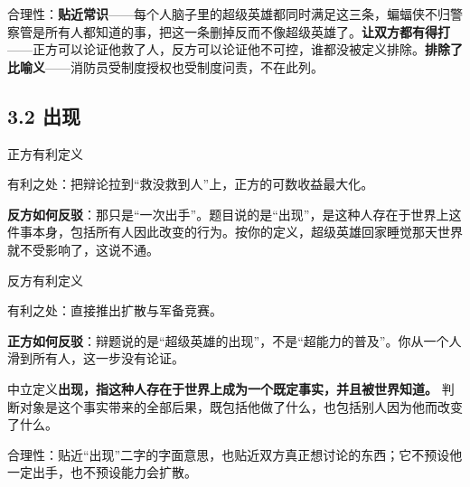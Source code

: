 \documentclass[prep,both]{debate}
\begin{document}
\begin{fields}
\begin{bullets}
\item 合理性：\textbf{贴近常识}——每个人脑子里的超级英雄都同时满足这三条，蝙蝠侠不归警察管是所有人都知道的事，把这一条删掉反而不像超级英雄了。\textbf{让双方都有得打}——正方可以论证他救了人，反方可以论证他不可控，谁都没被定义排除。\textbf{排除了比喻义}——消防员受制度授权也受制度问责，不在此列。
\end{bullets}
\end{fields}
\subsection{3.2 出现}
\begin{fields}
\begin{procard}{正方有利定义}\end{procard}
\begin{bullets}
\item 有利之处：把辩论拉到“救没救到人”上，正方的可数收益最大化。
\item \textbf{反方如何反驳}：那只是“一次出手”。题目说的是“出现”，是这种人存在于世界上这件事本身，包括所有人因此改变的行为。按你的定义，超级英雄回家睡觉那天世界就不受影响了，这说不通。
\end{bullets}
\begin{concard}{反方有利定义}\end{concard}
\begin{bullets}
\item 有利之处：直接推出扩散与军备竞赛。
\item \textbf{正方如何反驳}：辩题说的是“超级英雄的出现”，不是“超能力的普及”。你从一个人滑到所有人，这一步没有论证。
\end{bullets}
\begin{neutralcard}{中立定义}\textbf{出现，指这种人存在于世界上成为一个既定事实，并且被世界知道。} 判断对象是这个事实带来的全部后果，既包括他做了什么，也包括别人因为他而改变了什么。\end{neutralcard}
\begin{bullets}
\item 合理性：贴近“出现”二字的字面意思，也贴近双方真正想讨论的东西；它不预设他一定出手，也不预设能力会扩散。
\end{bullets}
\end{fields}
\end{document}
